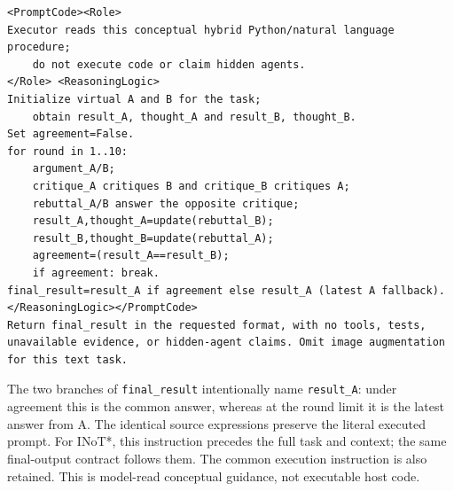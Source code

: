\begin{lstlisting}[basicstyle=\ttfamily\small,breaklines=true,columns=fullflexible,keepspaces=true,showstringspaces=false,frame=single,framerule=0.3pt]
<PromptCode><Role>
Executor reads this conceptual hybrid Python/natural language procedure;
    do not execute code or claim hidden agents.
</Role> <ReasoningLogic>
Initialize virtual A and B for the task;
    obtain result_A, thought_A and result_B, thought_B.
Set agreement=False.
for round in 1..10:
    argument_A/B;
    critique_A critiques B and critique_B critiques A;
    rebuttal_A/B answer the opposite critique;
    result_A,thought_A=update(rebuttal_B);
    result_B,thought_B=update(rebuttal_A);
    agreement=(result_A==result_B);
    if agreement: break.
final_result=result_A if agreement else result_A (latest A fallback).
</ReasoningLogic></PromptCode>
Return final_result in the requested format, with no tools, tests, unavailable evidence, or hidden-agent claims. Omit image augmentation for this text task.
\end{lstlisting}
The two branches of \texttt{final\_result} intentionally name \texttt{result\_A}: under agreement this is the common answer, whereas at the round limit it is the latest answer from A. The identical source expressions preserve the literal executed prompt.
For INoT*, this instruction precedes the full task and context; the same final-output contract follows them. The common execution instruction is also retained. This is model-read conceptual guidance, not executable host code.
\endgroup
